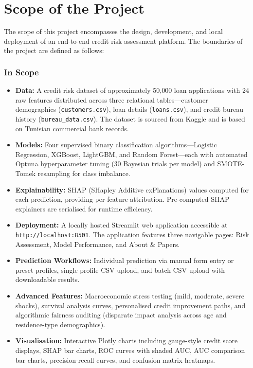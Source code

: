 \documentclass[12pt,a4paper]{report}
\begin{document}
\chapter{Scope of the Project}

The scope of this project encompasses the design, development, and local deployment of an end-to-end credit risk assessment platform. The boundaries of the project are defined as follows:

\subsection*{In Scope}
\begin{itemize}
    \item \textbf{Data:} A credit risk dataset of approximately 50,000 loan applications with 24 raw features distributed across three relational tables---customer demographics (\texttt{customers.csv}), loan details (\texttt{loans.csv}), and credit bureau history (\texttt{bureau\_data.csv}). The dataset is sourced from Kaggle and is based on Tunisian commercial bank records.

    \item \textbf{Models:} Four supervised binary classification algorithms---Logistic Regression, XGBoost, LightGBM, and Random Forest---each with automated Optuna hyperparameter tuning (30 Bayesian trials per model) and SMOTE-Tomek resampling for class imbalance.

    \item \textbf{Explainability:} SHAP (SHapley Additive exPlanations) values computed for each prediction, providing per-feature attribution. Pre-computed SHAP explainers are serialised for runtime efficiency.

    \item \textbf{Deployment:} A locally hosted Streamlit web application accessible at \texttt{http://localhost:8501}. The application features three navigable pages: Risk Assessment, Model Performance, and About \& Papers.

    \item \textbf{Prediction Workflows:} Individual prediction via manual form entry or preset profiles, single-profile CSV upload, and batch CSV upload with downloadable results.

    \item \textbf{Advanced Features:} Macroeconomic stress testing (mild, moderate, severe shocks), survival analysis curves, personalised credit improvement paths, and algorithmic fairness auditing (disparate impact analysis across age and residence-type demographics).

    \item \textbf{Visualisation:} Interactive Plotly charts including gauge-style credit score displays, SHAP bar charts, ROC curves with shaded AUC, AUC comparison bar charts, precision-recall curves, and confusion matrix heatmaps.
\end{itemize}
\end{document}
